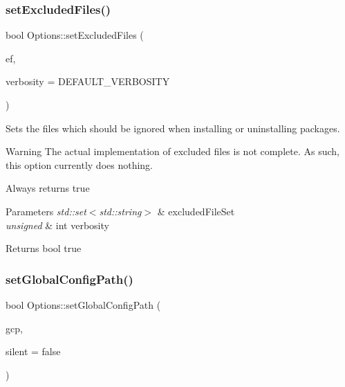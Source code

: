 \subsubsection{\texorpdfstring{setExcludedFiles()}{setExcludedFiles()}\hspace{0.1cm}{\footnotesize\ttfamily [2/2]}}
{\footnotesize\ttfamily bool Options\+::set\+Excluded\+Files (\begin{DoxyParamCaption}\item[{std\+::set$<$ std\+::string $>$}]{ef,  }\item[{unsigned int}]{verbosity = {\ttfamily DEFAULT\+\_\+VERBOSITY} }\end{DoxyParamCaption})}



Sets the files which should be ignored when installing or uninstalling packages. 

\begin{DoxyWarning}{Warning}
The actual implementation of excluded files is not complete. As such, this option currently does nothing.
\end{DoxyWarning}
Always returns true


\begin{DoxyParams}{Parameters}
{\em std\+::set$<$std\+::string$>$} & excluded\+File\+Set \\
\hline
{\em unsigned} & int verbosity\\
\hline
\end{DoxyParams}
\begin{DoxyReturn}{Returns}
bool true 
\end{DoxyReturn}
\mbox{\label{classOptions_a46eafded0a6dd4657fcb6da1f9b5fdcd}} 
\subsubsection{\texorpdfstring{setGlobalConfigPath()}{setGlobalConfigPath()}\hspace{0.1cm}{\footnotesize\ttfamily [1/2]}}
{\footnotesize\ttfamily bool Options\+::set\+Global\+Config\+Path (\begin{DoxyParamCaption}\item[{std\+::string}]{gcp,  }\item[{bool}]{silent = {\ttfamily false} }\end{DoxyParamCaption})}



